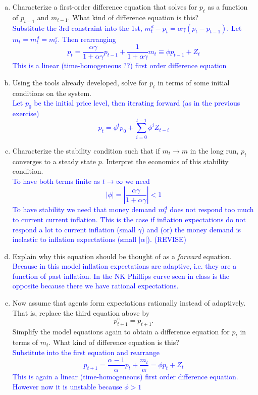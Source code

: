 \documentclass[11pt]{extarticle}
\theoremstyle{plain}
\theoremstyle{definition}
\begin{document}
\begin{enumerate}[(a)]
\item Characterize a first-order difference equation that solves for $p_t$ as a function of $p_{t-1}$ and $m_{t-1}$. What kind of difference equation is this? \\
\textcolor{blue}{Substitute the 3rd constraint into the 1st, $m_t^d-p_t=\alpha \gamma (p_t-p_{t-1})$. Let $m_t= m_t^d=m_t^s$. Then rearranging $$
p_t=\frac{\alpha \gamma}{1+\alpha \gamma} p_{t-1}+\frac{1}{1+\alpha \gamma} m_t \equiv \phi p_{t-1}+Z_t
$$ This is a linear (time-homogeneous ??) first order difference equation}
\item Using the tools already developed, solve for $p_t$ in terms of some initial conditions on the system.\\
\textcolor{blue}{Let $p_0$ be the initial price level, then iterating forward (as in the previous exercise) $$p_t=\phi^t p_0+\sum_{i=0}^{t-1} \phi^i Z_{t-i}$$}
\item Characterize the stability condition such that if $m_t \to m$ in the long run, $p_t$ converges to a steady state $p$. Interpret the economics of this stability condition. \\
\textcolor{blue}{To have both terms finite as $t\rightarrow \infty$ we need $$|\phi|=|\frac{\alpha \gamma}{1+\alpha \gamma}|<1$$ To have stability we need that money demand $m_t^d$ does not respond too much to current current inflation. This is the case if inflation expectations do not respond a lot to current inflation (small $\gamma$) and (or) the money demand is inelastic to inflation expectations (small $|\alpha|$). (REVISE)}

\item Explain why this equation should be thought of as a \textit{forward} equation.\\
\textcolor{blue}{Because in this model inflation expectations are adaptive, i.e. they are a function of past inflation. In the NK Phillips curve seen in class is the opposite because there we have rational expectations.}

\item Now assume that agents form expectations rationally instead of adaptively. That is, replace the third equation above by 
\begin{equation*}
	p_{t+1}^e = p_{t+1}.
\end{equation*}
Simplify the model equations again to obtain a difference equation for $p_t$ in terms of $m_t$. What kind of difference equation is this? \\
\textcolor{blue}{Substitute into the first equation and rearrange $$
p_{t+1}=\frac{\alpha-1}{\alpha} p_t+\frac{m_t}{\alpha}=\phi p_t+Z_t
$$ This is again a linear (time-homogeneous) first order difference equation. However now it is unstable because $\phi >1$}


\end{enumerate}
\end{document}
